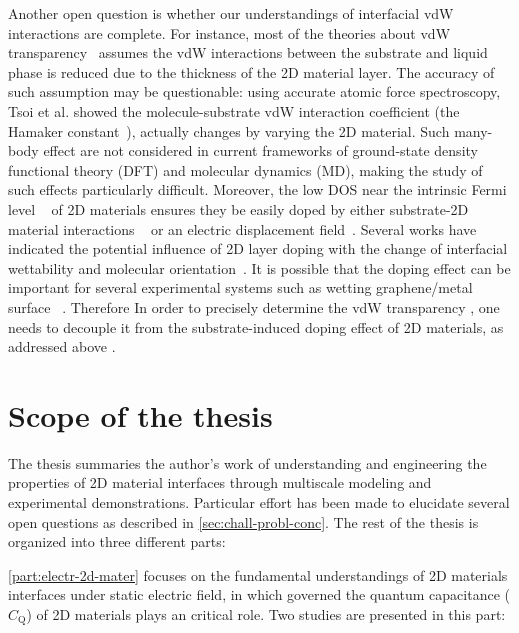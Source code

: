Another open question is whether our understandings of interfacial vdW
interactions are complete. For instance, most of the theories about
vdW transparency~\cite{shih_breakdown_2012,Kim_2015_wetting_controversy}
assumes the
vdW interactions between the substrate and liquid phase is reduced due
to the thickness of the 2D material layer.
%
The accuracy of such assumption may be questionable: using accurate atomic
force spectroscopy, Tsoi et al. showed the molecule-substrate vdW
interaction coefficient (the Hamaker
constant~\cite{parsegian_van_2010}), actually changes by varying the
2D material\cite{Tsoi_2014_vdW_screening_2D}.
%
Such many-body effect are not considered in current frameworks of
ground-state density functional theory (DFT) and molecular dynamics
(MD), making the study of such effects particularly difficult.
%
Moreover, the low DOS near the intrinsic Fermi level
~\cite{Das_Sarma_2011_electron_gr,Bhimanapati_2015_2D_rev} of 2D
materials ensures they be easily doped by either substrate-2D material
interactions
~\cite{Varchon_2007_doping,Giovannetti_2008_doping,Chen_2013_doping}
or an electric displacement
field~\cite{Das_2008_doping,Perera_2013_doping}.
%
Several works have indicated the potential influence of 2D layer
doping with the change of interfacial wettability and molecular
orientation~\cite{Huttmann_2015_vdw_gr_doping,Nguyen_2019_PEN}.
%
It is possible that the doping effect can be important for several
experimental systems such as wetting
graphene\allowbreak{}/\allowbreak{}metal
surface~\cite{Giovannetti_2008_doping,Pi_2009_metal_doping_gr} .
%
Therefore In order to precisely determine the vdW transparency , one
needs to decouple it from the substrate-induced doping effect of 2D
materials, as addressed above
\cite{Huttmann_2015_vdw_gr_doping,Muruganathan_2015_tunable_vdw_gr,Hong_2016_mechanism,Ashraf_2016_doping}.


\section{Scope of the thesis}
\label{sec:scope-thesis}

The thesis summaries the author's work of understanding and
engineering the properties of 2D material interfaces through
multiscale modeling and experimental demonstrations. Particular effort
has been made to elucidate several open questions as described in
\autoref{sec:chall-probl-conc}. The rest of the thesis is organized
into three different parts:

\autoref{part:electr-2d-mater} focuses on the fundamental
understandings of 2D materials interfaces under static electric field,
in which governed the quantum capacitance ($C_{\mathrm{Q}}$) of 2D
materials plays an critical role.
%
Two studies are
presented in this part:
%


